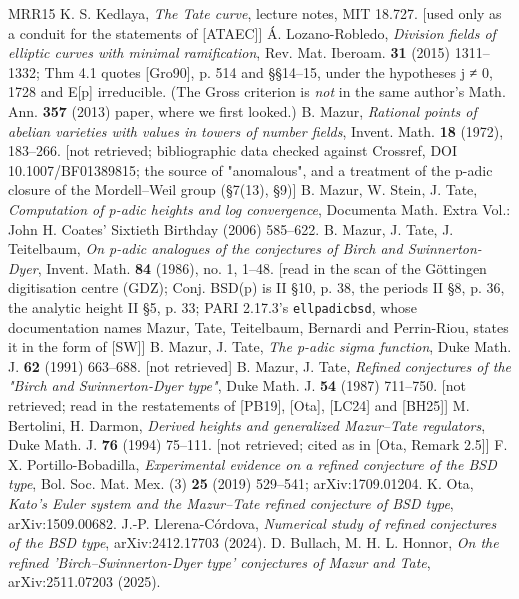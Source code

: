 \documentclass[11pt,a4paper]{article}
\theoremstyle{named}
\begin{document}
\begin{thebibliography}{MRR15}
 K. S. Kedlaya, \textit{The Tate curve}, lecture notes, MIT 18.727. [used only as a conduit for the statements of [ATAEC]]
 Á. Lozano-Robledo, \textit{Division fields of elliptic curves with minimal ramification}, Rev. Mat. Iberoam. \textbf{31} (2015) 1311–1332; Thm 4.1 quotes [Gro90], p. 514 and §§14–15, under the hypotheses j ≠ 0, 1728 and E[p] irreducible. (The Gross criterion is \textit{not} in the same author's Math. Ann. \textbf{357} (2013) paper, where we first looked.)
 B. Mazur, \textit{Rational points of abelian varieties with values in towers of number fields}, Invent. Math. \textbf{18} (1972), 183–266. [not retrieved; bibliographic data checked against Crossref, DOI 10.1007/BF01389815; the source of "anomalous", and a treatment of the p-adic closure of the Mordell–Weil group (§7(13), §9)]
 B. Mazur, W. Stein, J. Tate, \textit{Computation of p-adic heights and log convergence}, Documenta Math. Extra Vol.: John H. Coates' Sixtieth Birthday (2006) 585–622.
 B. Mazur, J. Tate, J. Teitelbaum, \textit{On p-adic analogues of the conjectures of Birch and Swinnerton-Dyer}, Invent. Math. \textbf{84} (1986), no. 1, 1–48. [read in the scan of the Göttingen digitisation centre (GDZ); Conj. BSD(p) is II §10, p. 38, the periods II §8, p. 36, the analytic height II §5, p. 33; PARI 2.17.3's \texttt{ellpadicbsd}, whose documentation names Mazur, Tate, Teitelbaum, Bernardi and Perrin-Riou, states it in the form of [SW]]
 B. Mazur, J. Tate, \textit{The p-adic sigma function}, Duke Math. J. \textbf{62} (1991) 663–688. [not retrieved]
 B. Mazur, J. Tate, \textit{Refined conjectures of the "Birch and Swinnerton-Dyer type"}, Duke Math. J. \textbf{54} (1987) 711–750. [not retrieved; read in the restatements of [PB19], [Ota], [LC24] and [BH25]]
 M. Bertolini, H. Darmon, \textit{Derived heights and generalized Mazur–Tate regulators}, Duke Math. J. \textbf{76} (1994) 75–111. [not retrieved; cited as in [Ota, Remark 2.5]]
 F. X. Portillo-Bobadilla, \textit{Experimental evidence on a refined conjecture of the BSD type}, Bol. Soc. Mat. Mex. (3) \textbf{25} (2019) 529–541; arXiv:1709.01204.
 K. Ota, \textit{Kato's Euler system and the Mazur–Tate refined conjecture of BSD type}, arXiv:1509.00682.
 J.-P. Llerena-Córdova, \textit{Numerical study of refined conjectures of the BSD type}, arXiv:2412.17703 (2024).
 D. Bullach, M. H. L. Honnor, \textit{On the refined 'Birch–Swinnerton-Dyer type' conjectures of Mazur and Tate}, arXiv:2511.07203 (2025).

\end{thebibliography}
\end{document}
